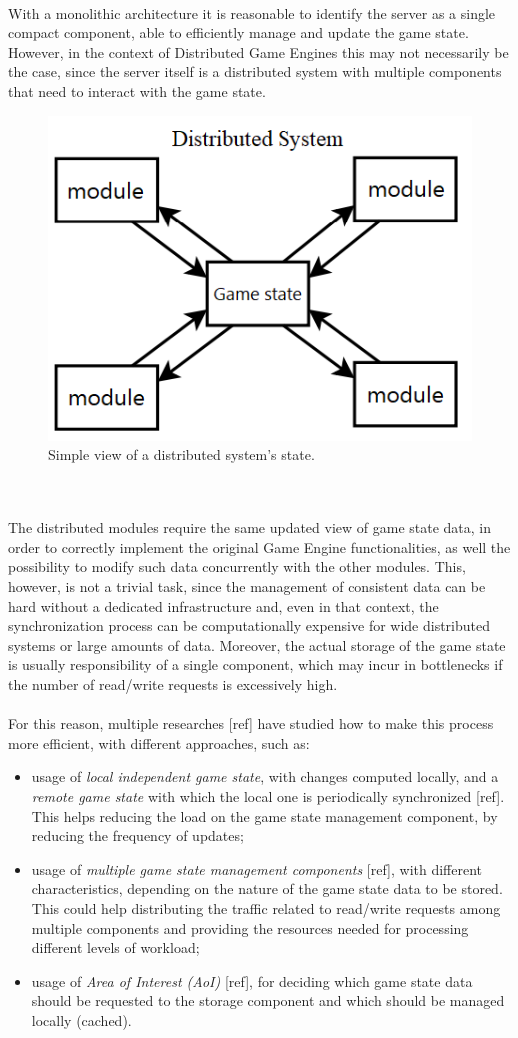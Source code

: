 \\ With a monolithic architecture it is reasonable to identify the server as a single compact component, able to efficiently manage and update the game state. However, in the context of Distributed Game Engines this may not necessarily be the case, since the server itself is a distributed system with multiple components that need to interact with the game state.
\begin{figure}
	\centering
	\includegraphics[width=0.55\linewidth]{immagini/State-of-the-art/simple-distributed-state}
	\caption[Simple view of a distributed system's state.]{Simple view of a distributed system's state.}
	\label{fig:simple-distributed-state}
\end{figure}
\\ \\The distributed modules require the same updated view of game state data, in order to correctly implement the original Game Engine functionalities, as well the possibility to modify such data concurrently with the other modules. This, however, is not a trivial task, since the management of consistent data can be hard without a dedicated infrastructure and, even in that context, the synchronization process can be computationally expensive for wide distributed systems or large amounts of data. Moreover, the actual storage of the game state is usually responsibility of a single component, which may incur in bottlenecks if the number of read/write requests is excessively high. \\ \\
For this reason, multiple researches [ref] have studied how to make this process more efficient, with different approaches, such as:
\begin{itemize}
	\item usage of \textit{local independent game state}, with changes computed locally, and a \textit{remote game state} with which the local one is periodically synchronized [ref]. This helps reducing the load on the game state management component, by reducing the frequency of updates;
	\item usage of \textit{multiple game state management components} [ref], with different characteristics, depending on the nature of the game state data to be stored. This could help distributing the traffic related to read/write requests among multiple components and providing the resources needed for processing different levels of workload;
	\item usage of \textit{Area of Interest (AoI)} [ref], for deciding which game state data should be requested to the storage component and which should be managed locally (cached).
\end{itemize}
